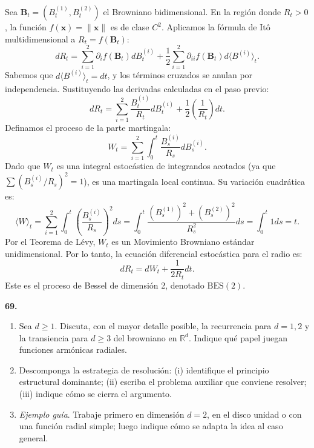 \documentclass[11pt, letterpaper]{article}
\begin{document}
\begin{solucion}
    Sea $\mathbf{B}_t = (B_t^{(1)}, B_t^{(2)})$ el Browniano bidimensional. En la región donde $R_t > 0$, la función $f(\mathbf{x}) = \|\mathbf{x}\|$ es de clase $C^2$.
    Aplicamos la fórmula de Itô multidimensional a $R_t = f(\mathbf{B}_t)$:
    \[ dR_t = \sum_{i=1}^2 \partial_i f(\mathbf{B}_t) dB_t^{(i)} + \frac{1}{2} \sum_{i=1}^2 \partial_{ii} f(\mathbf{B}_t) d\langle B^{(i)} \rangle_t. \]
    Sabemos que $d\langle B^{(i)} \rangle_t = dt$, y los términos cruzados se anulan por independencia. Sustituyendo las derivadas calculadas en el paso previo:
    \[ dR_t = \sum_{i=1}^2 \frac{B_t^{(i)}}{R_t} dB_t^{(i)} + \frac{1}{2} \left( \frac{1}{R_t} \right) dt. \]
    Definamos el proceso de la parte martingala:
    \[ W_t = \sum_{i=1}^2 \int_0^t \frac{B_s^{(i)}}{R_s} dB_s^{(i)}. \]
    Dado que $W_t$ es una integral estocástica de integrandos acotados (ya que $\sum (B_s^{(i)} / R_s)^2 = 1$), es una martingala local continua. Su variación cuadrática es:
    \[ \langle W \rangle_t = \sum_{i=1}^2 \int_0^t \left( \frac{B_s^{(i)}}{R_s} \right)^2 ds = \int_0^t \frac{(B_s^{(1)})^2 + (B_s^{(2)})^2}{R_s^2} ds = \int_0^t 1 ds = t. \]
    Por el Teorema de Lévy, $W_t$ es un Movimiento Browniano estándar unidimensional.
    Por lo tanto, la ecuación diferencial estocástica para el radio es:
    \[ dR_t = dW_t + \frac{1}{2R_t} dt. \]
    Este es el proceso de Bessel de dimensión 2, denotado $\text{BES}(2)$.
\end{solucion}

\newpage

\begin{ejercicio}
    \textbf{69.} 
    \begin{enumerate}
        \item Sea $d \ge 1$. Discuta, con el mayor detalle posible, la recurrencia para $d=1,2$ y la transiencia para $d \ge 3$ del browniano en $\mathbb{R}^d$. Indique qué papel juegan funciones armónicas radiales.
        \item Descomponga la estrategia de resolución: (i) identifique el principio estructural dominante; (ii) escriba el problema auxiliar que conviene resolver; (iii) indique cómo se cierra el argumento.
        \item \textit{Ejemplo guía}. Trabaje primero en dimensión $d=2$, en el disco unidad o con una función radial simple; luego indique cómo se adapta la idea al caso general.
    \end{enumerate}
\end{ejercicio}

\vspace{5mm}
\end{document}
